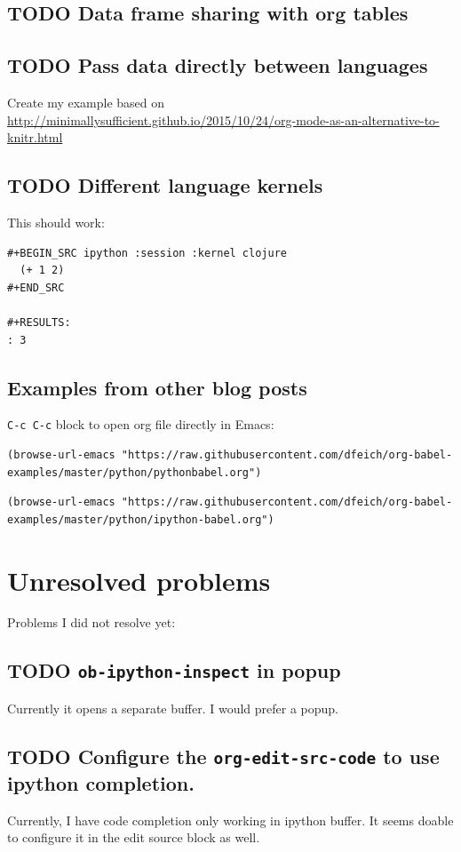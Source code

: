 \documentclass[11pt]{article}
\begin{document}
\subsection{{\bfseries\sffamily TODO} Data frame sharing with org tables}
\label{sec:orgheadline46}
\subsection{{\bfseries\sffamily TODO} Pass data directly between languages}
\label{sec:orgheadline10}
Create my example based on \url{http://minimallysufficient.github.io/2015/10/24/org-mode-as-an-alternative-to-knitr.html}
\subsection{{\bfseries\sffamily TODO} Different language kernels}
\label{sec:orgheadline47}
This should work:
\begin{verbatim}
#+BEGIN_SRC ipython :session :kernel clojure
  (+ 1 2)
#+END_SRC

#+RESULTS:
: 3
\end{verbatim}
\subsection{Examples from other blog posts}
\label{sec:orgheadline48}
\texttt{C-c C-c} block to open org file directly in Emacs:
\begin{verbatim}
(browse-url-emacs "https://raw.githubusercontent.com/dfeich/org-babel-examples/master/python/pythonbabel.org")
\end{verbatim}


\begin{verbatim}
(browse-url-emacs "https://raw.githubusercontent.com/dfeich/org-babel-examples/master/python/ipython-babel.org")
\end{verbatim}

\section{Unresolved problems}
\label{sec:orgheadline53}
Problems I did not resolve yet:
\subsection{{\bfseries\sffamily TODO} \texttt{ob-ipython-inspect} in popup}
\label{sec:orgheadline49}
Currently it opens a separate buffer. I would prefer a popup.
\subsection{{\bfseries\sffamily TODO} Configure the \texttt{org-edit-src-code} to use ipython completion.}
\label{sec:orgheadline50}
Currently, I have code completion only working in ipython buffer.
It seems doable to configure it in the edit source block as well.
\end{document}
